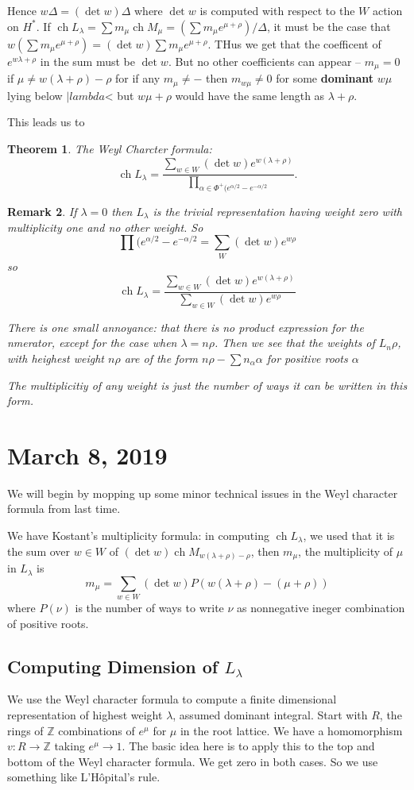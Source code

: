 \documentclass[12pt]{article}
\theoremstyle{nonumberbreak}
\theoremstyle{changebreak}
\newtheorem{thm}{Theorem}[subsection]
\theoremstyle{nonumberbreak}
\theoremstyle{change}
\newtheorem{rmk}[thm]{Remark}
\newcommand*{\Z}{
\mathbb{Z}
}
\DeclareMathOperator{\ch}{ch}
\begin{document}
Hence $w\Delta=(\det w)\Delta$ where $\det w$ is computed with respect to the $W$ action on $H^*$. If 
$\ch L_\lambda=\sum m_\mu \ch M_\mu=(\sum m_\mu e^{\mu+\rho})/\Delta$, it must be the case that 
$w(\sum m_\mu e^{\mu+\rho})=(\det w)\sum m_\mu e^{\mu+\rho}$. THus we get that the coefficent of 
$e^{w\lambda+\rho}$ in the sum must be $\det w$. But no other coefficients can appear -- $m_\mu=0$
if $\mu\ne w(\lambda+\rho)-\rho$ for if any $m_\mu\ne -$ then $m_{w\mu}\ne 0$ for some
\textbf{dominant} $w\mu$ lying below $|lambda$< but $w\mu+\rho$ would have the same length as $\lambda+\rho$.

This leads us to
\begin{thm}
	The Weyl Charcter formula:
	\[\ch L_\lambda=\frac{\sum_{w\in W}(\det w)e^{w(\lambda+\rho)}}{\prod_{\alpha\in \Phi^+(e^{\alpha/2}-e^{-\alpha/2}}}.\]
\end{thm}
\begin{rmk}
	If $\lambda=0$ then $L_\lambda$ is the trivial representation having weight zero with multiplicity one and no other weight. So 
	\[\prod(e^{\alpha/2}-e^{-\alpha/2}=\sum_W(\det w)e^{w\rho}\]
	so 
	\[\ch L_\lambda=\frac{\sum_{w\in W}(\det w)e^{w(\lambda+\rho)}}{\sum_{w\in W}(\det w)e^{w\rho}}\]

	There is one small annoyance: that there is no product expression for the nmerator, except for the case when $\lambda=n\rho$.
	Then we see that the weights of $L_n\rho$, with heighest weight $n\rho$ are of the form $n\rho-\sum n_\alpha\alpha$ for positive roots $\alpha$

	The multiplicitiy of any weight is just the number of ways it can be written in this form.
\end{rmk}

\section{March 8, 2019}
We will begin by mopping up some minor technical issues in the Weyl character formula from last time.

We have Kostant's multiplicity formula: in computing $\ch L_\lambda$, we used that it is the sum over $w\in W$
of $(\det w)\ch M_{w(\lambda+\rho)-\rho}$, then $m_\mu$, the multiplicity of $\mu$ in $L_\lambda$ is 
\[m_\mu=\sum_{w\in W}(\det w)P(w(\lambda+\rho)-(\mu+\rho))\]
where $P(\nu)$ is the number of ways to write $\nu$ as nonnegative ineger combination of positive roots.

\subsection{Computing Dimension of $L_\lambda$}
We use the Weyl character formula to compute a finite dimensional representation of highest weight $\lambda$, assumed dominant integral.
Start with $R$, the rings of $\Z$ combinations of $e^\mu$ for $\mu$ in the root lattice. We have a homomorphism $v:R\to \Z$ taking $e^\mu\to 1.$
The basic idea here is to apply this to the top and bottom of the Weyl character formula. We get zero in both
cases. So we use something like L'H\^opital's rule.
\end{document}
